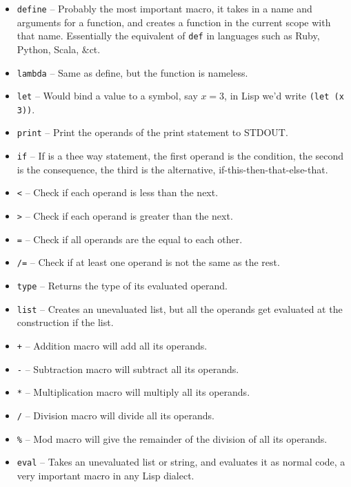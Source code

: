 \documentclass{article}
\newcommand{\code}[1]{\texttt{#1}}
\newcommand{\etc}{{\&}ct.}
\begin{document}
      \begin{itemize}
        \item \code{define} -- Probably the most important macro, it takes in a
                               name and arguments for a function, and creates a
                               function in the current scope with that name.
                               Essentially the equivalent of \code{def} in
                               languages such as Ruby, Python, Scala, \etc

        \item \code{lambda} -- Same as define, but the function is nameless.


        \item \code{let} -- Would bind a value to a symbol, say $x = 3$, in Lisp
                            we'd write \code{(let (x 3))}.

        \item \code{print} -- Print the operands of the print statement to STDOUT.
        \item \code{if} -- If is a thee way statement, the first operand is the
                           condition, the second is the consequence, the third
                           is the alternative, if-this-then-that-else-that.

        \item \code{<} -- Check if each operand is less than the next.
        \item \code{>} -- Check if each operand is greater than the next.
        \item \code{=} -- Check if all operands are the equal to each other.
        \item \code{/=} -- Check if at least one operand is not the same as the rest.

        \item \code{type} -- Returns the type of its evaluated operand.

        \item \code{list} -- Creates an unevaluated list, but all the operands
                             get evaluated at the construction if the list.



        \item \code{+} -- Addition macro will add all its operands.
        \item \code{-} -- Subtraction macro will subtract all its operands.
        \item \code{*} -- Multiplication macro will multiply all its operands.
        \item \code{/} -- Division macro will divide all its operands.
        \item \code{\%} -- Mod macro will give the remainder of the division of
                           all its operands.

        \item \code{eval} -- Takes an unevaluated list or string, and evaluates
                             it as normal code, a very important macro in any
                             Lisp dialect.
      \end{itemize}
\end{document}
